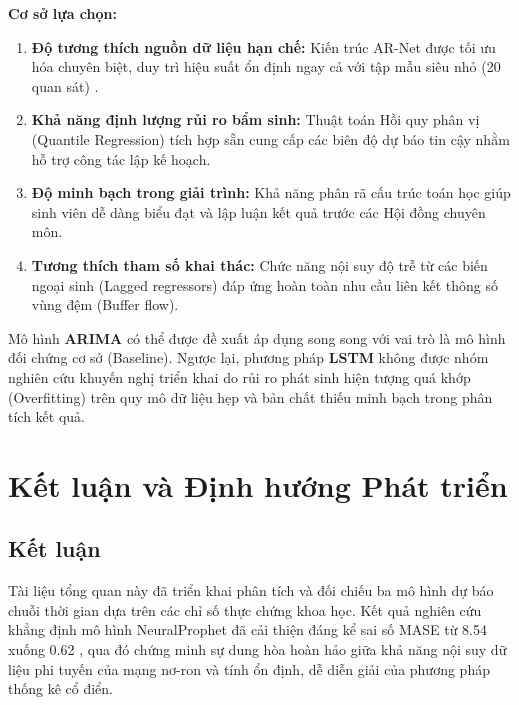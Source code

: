 \documentclass[12pt,a4paper]{article}
\begin{document}
\textbf{Cơ sở lựa chọn:}
\begin{enumerate}
    \item \textbf{Độ tương thích nguồn dữ liệu hạn chế:} Kiến trúc AR-Net được tối ưu hóa chuyên biệt, duy trì hiệu suất ổn định ngay cả với tập mẫu siêu nhỏ (20 quan sát) \cite{tribe2021neuralprophet}.
    \item \textbf{Khả năng định lượng rủi ro bẩm sinh:} Thuật toán Hồi quy phân vị (Quantile Regression) tích hợp sẵn cung cấp các biên độ dự báo tin cậy nhằm hỗ trợ công tác lập kế hoạch.
    \item \textbf{Độ minh bạch trong giải trình:} Khả năng phân rã cấu trúc toán học giúp sinh viên dễ dàng biểu đạt và lập luận kết quả trước các Hội đồng chuyên môn.
    \item \textbf{Tương thích tham số khai thác:} Chức năng nội suy độ trễ từ các biến ngoại sinh (Lagged regressors) đáp ứng hoàn toàn nhu cầu liên kết thông số vùng đệm (Buffer flow).
\end{enumerate}

Mô hình \textbf{ARIMA} có thể được đề xuất áp dụng song song với vai trò là mô hình đối chứng cơ sở (Baseline). Ngược lại, phương pháp \textbf{LSTM} không được nhóm nghiên cứu khuyến nghị triển khai do rủi ro phát sinh hiện tượng quá khớp (Overfitting) trên quy mô dữ liệu hẹp và bản chất thiếu minh bạch trong phân tích kết quả.


\section{Kết luận và Định hướng Phát triển}

\subsection{Kết luận}

Tài liệu tổng quan này đã triển khai phân tích và đối chiếu ba mô hình dự báo chuỗi thời gian dựa trên các chỉ số thực chứng khoa học. Kết quả nghiên cứu khẳng định mô hình NeuralProphet đã cải thiện đáng kể sai số MASE từ 8.54 xuống 0.62 \cite{tribe2021neuralprophet}, qua đó chứng minh sự dung hòa hoàn hảo giữa khả năng nội suy dữ liệu phi tuyến của mạng nơ-ron và tính ổn định, dễ diễn giải của phương pháp thống kê cổ điển.
\end{document}
